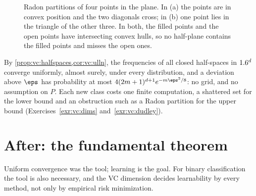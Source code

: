\begin{refsection}
\begin{figure}[t]
\centering
{}
\caption{Radon partitions of four points in the plane. In (a) the points are in convex position and the two diagonals cross; in (b) one point lies in the triangle of the other three. In both, the filled points and the open points have intersecting convex hulls, so no half-plane contains the filled points and misses the open ones.}
\label{fig:vc:radon}
\end{figure}

By \cref{prop:vc:halfspaces,cor:vc:ulln}, the frequencies of all closed half-spaces in $1.6^d$ converge uniformly, almost surely, under every distribution, and a deviation above $\eps$ has probability at most $4(2m+1)^{d+1}e^{-m\eps^2/8}$: no grid, and no assumption on $P$. Each new class costs one finite computation, a shattered set for the lower bound and an obstruction such as a Radon partition for the upper bound (Exercises~\ref{exr:vc:dims} and~\ref{exr:vc:dudley}).

\section{After: the fundamental theorem}\label{sec:vc:after2}

Uniform convergence was the tool; learning is the goal. For binary classification the tool is also necessary, and the VC dimension decides learnability by every method, not only by empirical risk minimization.


\end{refsection}
